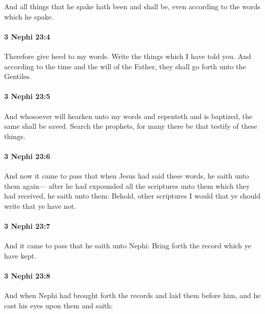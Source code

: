 			And all things that he spake hath been and shall be,
			even according to the words which he spake.

		\paragraph{3 Nephi 23:4} %
			\label{3NEPHI-23-4}

			Therefore give heed to my words.
			Write the things which I have told you.
			And according to the time and the will of the Father,
			they shall go forth unto the Gentiles.

		\paragraph{3 Nephi 23:5} %
			\label{3NEPHI-23-5}

			And whosoever will hearken unto my words
			and repenteth and is baptized,
			the same shall be saved.
			Search the prophets, for many there be that testify of these things.

		\paragraph{3 Nephi 23:6} %
			\label{3NEPHI-23-6}

			And now it came to pass that
			when Jesus had said these words,
			he saith unto them again---
			after he had expounded all the scriptures unto them
			which they had received,
			he saith unto them:
			Behold, other scriptures I would that ye should write that ye have not.

		\paragraph{3 Nephi 23:7} %
			\label{3NEPHI-23-7}

			And it came to pass that he saith unto Nephi:
			Bring forth the record which ye have kept.

		\paragraph{3 Nephi 23:8} %
			\label{3NEPHI-23-8}

			And when Nephi had brought forth the records
			and laid them before him,
			and he cast his eyes upon them and saith:

